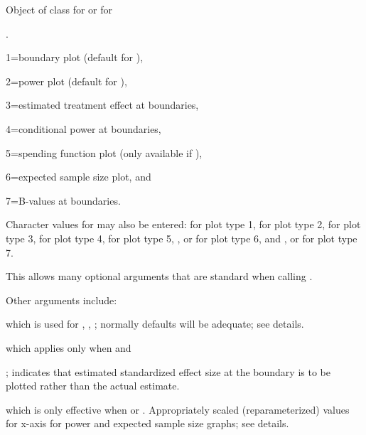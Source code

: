 \begin{Arguments}
\begin{ldescription}
\item[\code{x}] Object of class  for  or  for 

.
\item[\code{plottype}] 1=boundary plot (default for ),

2=power plot (default for ), 

3=estimated treatment effect at boundaries, 

4=conditional power at boundaries, 

5=spending function plot 
(only available if ), 

6=expected sample size plot, and 

7=B-values at boundaries. 

Character values for  may also be entered:  for plot
type 1,
 for plot type 2,  for plot type 3,
 for plot type 4,  for plot type 5, , 
 or  for plot type 6, and ,  or 
 for plot type 7.
\item[\code{...}] This allows many optional arguments that are standard when calling .

Other arguments include: 

 which is used for , , ; normally defaults will be adequate; see details. 

 which applies only when  and 

; indicates that estimated standardized effect size
at the boundary is to be plotted rather than the actual estimate.

 which is only effective when  or . Appropriately scaled (reparameterized) values for x-axis for power and expected sample size graphs; see details.
\end{ldescription}
\end{Arguments}
